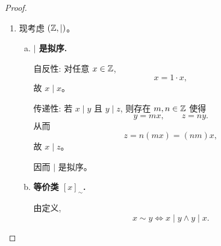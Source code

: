 \documentclass[a4paper, justified]{tufte-handout}
\begin{document}
\begin{proof}
\begin{enumerate}[(1)]
      \begin{enumerate}[(i)]
        \item \textbf{自反性.} 对任意 $[x]_{\sim} \in X/\sim$, 由 $\preceq$ 自反,
          \[
            x \preceq x,
          \]
          故
          \[
            [x]_{\sim} \le [x]_{\sim}.
          \]

        \item \textbf{反对称性.} 若
          \[
            [x]_{\sim} \le [y]_{\sim}
            \qquad \text{且} \qquad
            [y]_{\sim} \le [x]_{\sim},
          \]
          则
          \[
            x \preceq y
            \qquad \text{且} \qquad
            y \preceq x.
          \]
          故 $x \sim y$, 从而
          \[
            [x]_{\sim} = [y]_{\sim}.
          \]

        \item \textbf{传递性.} 若
          \[
            [x]_{\sim} \le [y]_{\sim}
            \qquad \text{且} \qquad
            [y]_{\sim} \le [z]_{\sim},
          \]
          则
          \[
            x \preceq y
            \qquad \text{且} \qquad
            y \preceq z.
          \]
          由 $\preceq$ 的传递性,
          \[
            x \preceq z.
          \]
          故
          \[
            [x]_{\sim} \le [z]_{\sim}.
          \]
      \end{enumerate}

      因而 $\le$ 是偏序关系。

    \item 现考虑 $(\mathbb{Z}, \mid)$。

      \begin{enumerate}[(a)]
        \item \textbf{$\mid$ 是拟序.}

          自反性: 对任意 $x \in \mathbb{Z}$,
          \[
            x = 1 \cdot x,
          \]
          故 $x \mid x$。

          传递性: 若 $x \mid y$ 且 $y \mid z$, 则存在 $m, n \in \mathbb{Z}$ 使得
          \[
            y = mx,
            \qquad
            z = ny.
          \]
          从而
          \[
            z = n(mx) = (nm)x,
          \]
          故 $x \mid z$。

          因而 $\mid$ 是拟序。

        \item \textbf{等价类 $[x]_{\sim}$.}

          由定义,
          \[
            x \sim y
            \iff x \mid y \land y \mid x.
          \]


\end{enumerate}
\end{enumerate}
\end{proof}
\end{document}
